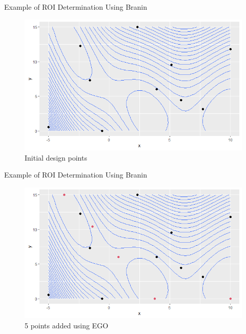 \documentclass{beamer}
\begin{document}
\begin{frame}{Example of ROI Determination Using Branin}
    \begin{figure}
        \centering
        \includegraphics[scale=.5]{images/branin/R0.png}
        \caption{Initial design points}
        \label{fig:branin0}
    \end{figure}
\end{frame}
\begin{frame}{Example of ROI Determination Using Branin}
    \begin{figure}
        \centering
        \includegraphics[scale=.5]{images/branin/R1.png}
        \caption{5 points added using EGO}
        \label{fig:branin1}
    \end{figure}
\end{frame}
\end{document}
